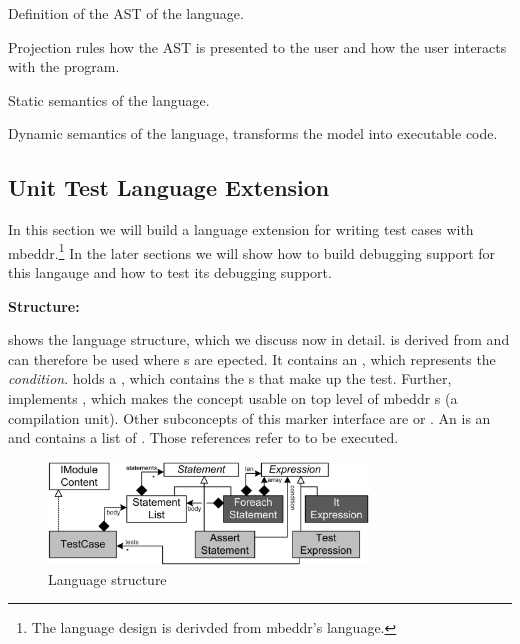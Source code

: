 Definition of the \ac{AST} of the language.

 Projection rules how the \ac{AST} is presented to the user and how the user interacts with the program.

 Static semantics of the language.
 
 Dynamic semantics of the language, transforms the model into executable code.

\subsection{Unit Test Language Extension}

In this section we will build a language extension
for writing test cases with mbeddr.\footnote{The language design is derivded 
from mbeddr's  language.}  In the later sections we will show
how to build debugging support for this langauge and how to test its debugging
support.

\noindent \textbf{Structure:}

 shows the language structure, which we discuss now
in detail.  is derived from  and can therefore
be used where s are epected. It contains an , which
represents the \emph{condition}.
 holds a , which contains the s
that make up the test. Further,  implements ,
which makes the concept usable on top level of mbeddr s (a
compilation unit). Other subconcepts of this marker interface are 
 or .
An  is an  and contains a list of
. Those references refer to  to be executed.

\begin{figure}[h]
  \vspace{-2mm}
  \centering
    \includegraphics[width=8.5cm]{./figures/umldiag.png} 
    \vspace{-2mm}
    \caption{Language structure}
  \label{fig:UnitTestStructure}
  \vspace{-2mm}
\end{figure}

